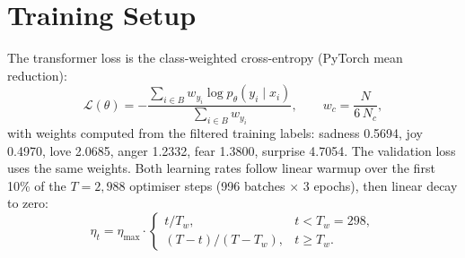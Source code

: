 \documentclass[11pt,a4paper]{article}
\begin{document}
\section{Training Setup}
\label{sec:training}
The transformer loss is the class-weighted cross-entropy (PyTorch mean reduction):
\begin{equation}
\mathcal{L}(\theta)=-\frac{\sum_{i\in B} w_{y_i}\log p_\theta(y_i\mid x_i)}{\sum_{i\in B} w_{y_i}},\qquad w_c=\frac{N}{6\,N_c},
\end{equation}
with weights computed from the filtered training labels: sadness 0.5694, joy 0.4970, love 2.0685, anger 1.2332, fear 1.3800, surprise 4.7054. The validation loss uses the same weights. Both learning rates follow linear warmup over the first 10\% of the $T=2{,}988$ optimiser steps (996 batches $\times$ 3 epochs), then linear decay to zero:
\begin{equation}
\eta_t=\eta_{\max}\cdot\begin{cases} t/T_w, & t<T_w=298,\\[2pt] (T-t)/(T-T_w), & t\ge T_w.\end{cases}
\end{equation}
\end{document}
